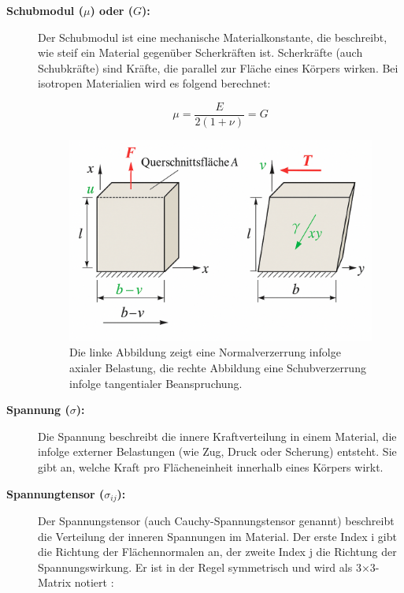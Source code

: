 \begin{description}
	\item[\textbf{Schubmodul ($\mu$) oder ($G$):}] Der Schubmodul ist eine mechanische Materialkonstante, die beschreibt, wie steif ein Material gegenüber Scherkräften ist.
	Scherkräfte (auch Schubkräfte) sind Kräfte, die parallel zur Fläche eines Körpers wirken. 
	Bei isotropen Materialien wird es folgend berechnet:

	\begin{equation}
		\mu = 
		\frac{E}{2(1 + \nu)} =
		G
	\end{equation}
	
	\begin{figure} [h]
		\centering
		\includegraphics[width=\textwidth]{papers/elastomechanik/images/teil1/Zugverformung_Schubverformung.png}
		\caption{Die linke Abbildung zeigt eine Normalverzerrung infolge axialer Belastung, die rechte Abbildung eine Schubverzerrung infolge tangentialer Beanspruchung.}
		\label{fig:Zugverformung_Schubverformung}
	\end{figure}

	\item[\textbf{Spannung ($\sigma$):}] Die Spannung beschreibt die innere Kraftverteilung in einem Material, die infolge externer Belastungen (wie Zug, Druck oder Scherung) entsteht. 
	Sie gibt an, welche Kraft pro Flächeneinheit innerhalb eines Körpers wirkt.
	
	\item[\textbf{Spannungtensor ($\sigma_{ij}$):}] Der Spannungstensor (auch Cauchy-Spannungstensor genannt) beschreibt die Verteilung der inneren Spannungen im Material. 
	Der erste Index	i gibt die Richtung der Flächennormalen an, der zweite Index j die Richtung der Spannungswirkung. 
	Er ist in der Regel symmetrisch und wird als 3×3-Matrix notiert \cite{elastomechanik:Grundlagen der Elastizitaetstheorie}:


\end{description}
